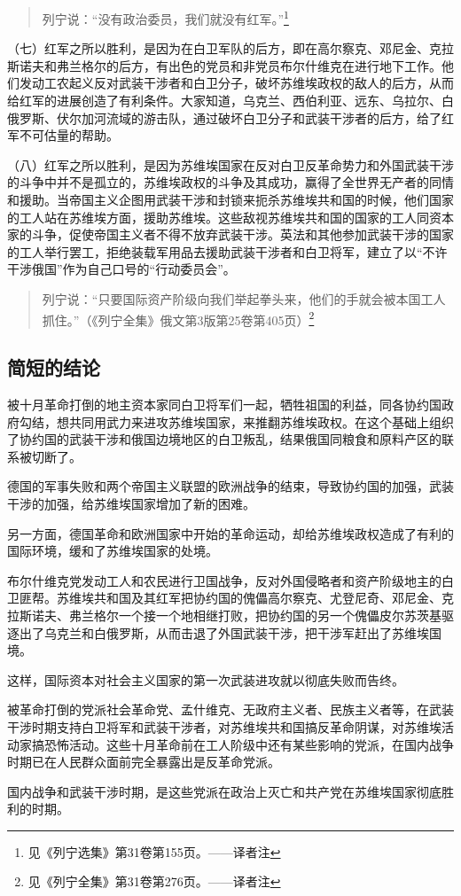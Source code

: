 \begin{quotation}
列宁说：“没有政治委员，我们就没有红军。”\footnote{见《列宁选集》第31卷第155页。——译者注}
\end{quotation}

（七）红军之所以胜利，是因为在白卫军队的后方，即在高尔察克、邓尼金、克拉斯诺夫和弗兰格尔的后方，有出色的党员和非党员布尔什维克在进行地下工作。他们发动工农起义反对武装干涉者和白卫分子，破坏苏维埃政权的敌人的后方，从而给红军的进展创造了有利条件。大家知道，乌克兰、西伯利亚、远东、乌拉尔、白俄罗斯、伏尔加河流域的游击队，通过破坏白卫分子和武装干涉者的后方，给了红军不可估量的帮助。

（八）红军之所以胜利，是因为苏维埃国家在反对白卫反革命势力和外国武装干涉的斗争中并不是孤立的，苏维埃政权的斗争及其成功，赢得了全世界无产者的同情和援助。当帝国主义企图用武装干涉和封锁来扼杀苏维埃共和国的时候，他们国家的工人站在苏维埃方面，援助苏维埃。这些敌视苏维埃共和国的国家的工人同资本家的斗争，促使帝国主义者不得不放弃武装干涉。英法和其他参加武装干涉的国家的工人举行罢工，拒绝装载军用品去援助武装干涉者和白卫将军，建立了以“不许干涉俄国”作为自己口号的“行动委员会”。

\begin{quotation}
列宁说：“只要国际资产阶级向我们举起拳头来，他们的手就会被本国工人抓住。”（《列宁全集》俄文第3版第25卷第405页）\footnote{见《列宁全集》第31卷第276页。——译者注}
\end{quotation}


\subsection{简短的结论}

被十月革命打倒的地主资本家同白卫将军们一起，牺牲祖国的利益，同各协约国政府勾结，想共同用武力来进攻苏维埃国家，来推翻苏维埃政权。在这个基础上组织了协约国的武装干涉和俄国边境地区的白卫叛乱，结果俄国同粮食和原料产区的联系被切断了。

德国的军事失败和两个帝国主义联盟的欧洲战争的结束，导致协约国的加强，武装干涉的加强，给苏维埃国家增加了新的困难。

另一方面，德国革命和欧洲国家中开始的革命运动，却给苏维埃政权造成了有利的国际环境，缓和了苏维埃国家的处境。

布尔什维克党发动工人和农民进行卫国战争，反对外国侵略者和资产阶级地主的白卫匪帮。苏维埃共和国及其红军把协约国的傀儡高尔察克、尤登尼奇、邓尼金、克拉斯诺夫、弗兰格尔一个接一个地相继打败，把协约国的另一个傀儡皮尔苏茨基驱逐出了乌克兰和白俄罗斯，从而击退了外国武装干涉，把干涉军赶出了苏维埃国境。

这样，国际资本对社会主义国家的第一次武装进攻就以彻底失败而告终。

被革命打倒的党派社会革命党、孟什维克、无政府主义者、民族主义者等，在武装干涉时期支持白卫将军和武装干涉者，对苏维埃共和国搞反革命阴谋，对苏维埃活动家搞恐怖活动。这些十月革命前在工人阶级中还有某些影响的党派，在国内战争时期已在人民群众面前完全暴露出是反革命党派。

国内战争和武装干涉时期，是这些党派在政治上灭亡和共产党在苏维埃国家彻底胜利的时期。

